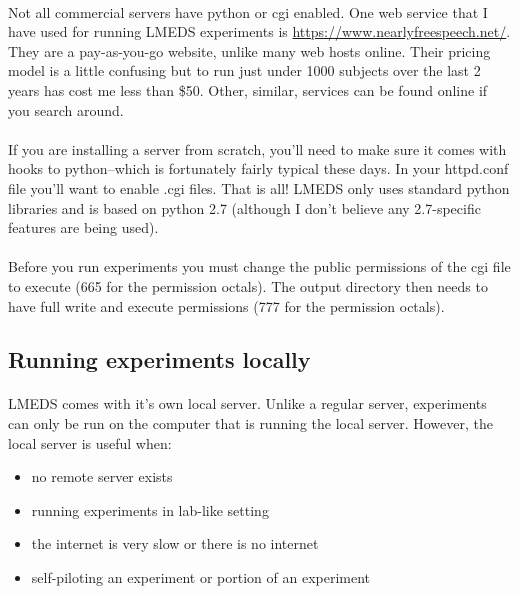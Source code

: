 \paragraph{}
Not all commercial servers have python or cgi enabled.  One web service that I have used for running LMEDS experiments is \url{https://www.nearlyfreespeech.net/}.  They are a pay-as-you-go website, unlike many web hosts online.  Their pricing model is a little confusing but to run just under 1000 subjects over the last 2 years has cost me less than \$50.  Other, similar, services can be found online if you search around.

\paragraph{}
If you are installing a server from scratch, you'll need to make sure it comes with hooks to python--which is fortunately fairly typical these days.  In your httpd.conf file you'll want to enable .cgi files.  That is all!  LMEDS only uses standard python libraries and is based on python 2.7 (although I don't believe any 2.7-specific features are being used).

\paragraph{}
\begin{tcolorbox}[breakable,colback=white,colframe=green,width=\dimexpr\textwidth+12mm\relax,enlarge left by=-6mm,enlarge right by=6mm]
Before you run experiments you must change the public permissions of the cgi file to execute (665 for the permission octals).  The output directory then needs to have full write and execute permissions (777 for the permission octals).
\end{tcolorbox}

\subsection{Running experiments locally} 

\paragraph{}
LMEDS comes with it's own local server.  Unlike a regular server, experiments can only be run on the computer that is running the local server.  However, the local server is useful when:

\begin{itemize}
\item no remote server exists
\item running experiments in lab-like setting
\item the internet is very slow or there is no internet
\item self-piloting an experiment or portion of an experiment
\end{itemize}

